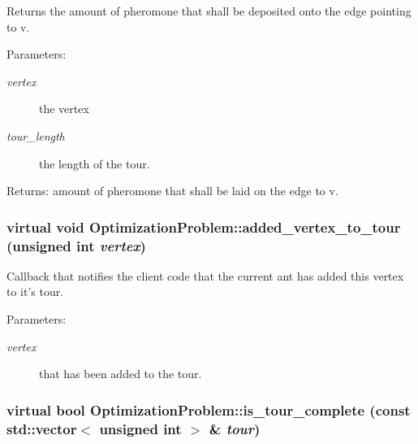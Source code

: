 Returns the amount of pheromone that shall be deposited onto the edge pointing to v. 

\begin{Desc}
\item[Parameters:]
\begin{description}
\item[{\em vertex}]the vertex \item[{\em tour\_\-length}]the length of the tour. \end{description}
\end{Desc}
\begin{Desc}
\item[Returns:]amount of pheromone that shall be laid on the edge to v. \end{Desc}
\hypertarget{classOptimizationProblem_3df069cbd0e948368a5696b21892cb7a}{
\subsubsection[added\_\-vertex\_\-to\_\-tour]{\setlength{\rightskip}{0pt plus 5cm}virtual void OptimizationProblem::added\_\-vertex\_\-to\_\-tour (unsigned int {\em vertex})}}
\label{classOptimizationProblem_3df069cbd0e948368a5696b21892cb7a}


Callback that notifies the client code that the current ant has added this vertex to it's tour. 

\begin{Desc}
\item[Parameters:]
\begin{description}
\item[{\em vertex}]that has been added to the tour. \end{description}
\end{Desc}
\hypertarget{classOptimizationProblem_41c614f3cb6cc0d96fa34adf129ff47f}{
\subsubsection[is\_\-tour\_\-complete]{\setlength{\rightskip}{0pt plus 5cm}virtual bool OptimizationProblem::is\_\-tour\_\-complete (const std::vector$<$ unsigned int $>$ \& {\em tour})}}
\label{classOptimizationProblem_41c614f3cb6cc0d96fa34adf129ff47f}


